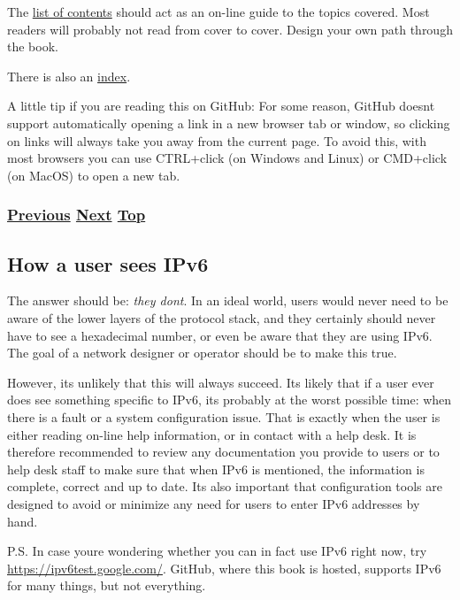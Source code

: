 \documentclass[
]{article}
\begin{document}
The \hyperref[list-of-contents]{list of contents} should act as an
on-line guide to the topics covered. Most readers will probably not read
from cover to cover. Design your own path through the book.

There is also an \hyperref[book6-main-index]{index}.

A little tip if you are reading this on GitHub: For some reason, GitHub
doesn\textquotesingle t support automatically opening a link in a new
browser tab or window, so clicking on links will always take you away
from the current page. To avoid this, with most browsers you can use
CTRL+click (on Windows and Linux) or CMD+click (on MacOS) to open a new
tab.

\subsubsection{\texorpdfstring{\hyperref[foreword]{Previous}
\hyperref[how-a-user-sees-ipv6]{Next}
\hyperref[introduction-and-foreword]{Top}}{Previous Next Top}}\label{previous-next-top}

\pagebreak

\subsection{How a user sees IPv6}\label{how-a-user-sees-ipv6}

The answer should be: \emph{they don\textquotesingle t}. In an ideal
world, users would never need to be aware of the lower layers of the
protocol stack, and they certainly should never have to see a
hexadecimal number, or even be aware that they are using IPv6. The goal
of a network designer or operator should be to make this true.

However, it\textquotesingle s unlikely that this will always succeed.
It\textquotesingle s likely that if a user ever does see something
specific to IPv6, it\textquotesingle s probably at the worst possible
time: when there is a fault or a system configuration issue. That is
exactly when the user is either reading on-line help information, or in
contact with a help desk. It is therefore recommended to review any
documentation you provide to users or to help desk staff to make sure
that when IPv6 is mentioned, the information is complete, correct and up
to date. It\textquotesingle s also important that configuration tools
are designed to avoid or minimize any need for users to enter IPv6
addresses by hand.

P.S. In case you\textquotesingle re wondering whether you can in fact
use IPv6 right now, try \url{https://ipv6test.google.com/}. GitHub,
where this book is hosted, supports IPv6 for many things, but not
everything.
\end{document}
